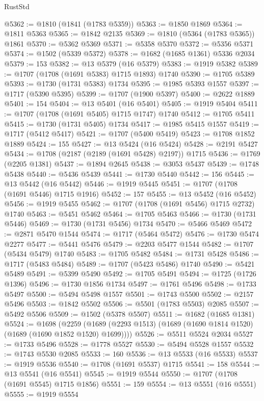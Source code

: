 \begin{lexlean}{RustStd}
\begin{coremodule}
@5362 := @1810 (@1841 (@1783 @5359))
@5363 := @1850 @1869
@5364 := @1811 @5363
@5365 := @1842 @2135
@5369 := @1810 (@5364 (@1783 @5365)) @1861
@5370 := @5362 @5369
@5371 := @5358 @5370
@5372 := @5356 @5371
@5374 := @1502 (@5339 @5372)
@5378 := @1682 (@1685 @1361) @5336 @2034
@5379 := 153
@5382 := @13 @5379 (@16 @5379)
@5383 := @1919 @5382
@5389 := @1707 (@1708 (@1691 @5383) @1715 @1893) @1740
@5390 := @1705 @5389
@5393 := @1730 (@1731 @5383) @1734
@5395 := @1985 @5393 @1557
@5397 := @1717 (@5390 @5395)
@5399 := @1707 (@1900 @5397)
@5400 := @2622 @1889
@5401 := 154
@5404 := @13 @5401 (@16 @5401)
@5405 := @1919 @5404
@5411 := @1707 (@1708 (@1691 @5405) @1715 @1747) @1740
@5412 := @1705 @5411
@5415 := @1730 (@1731 @5405) @1734
@5417 := @1985 @5415 @1557
@5419 := @1717 (@5412 @5417)
@5421 := @1707 (@5400 @5419)
@5423 := @1708 @1852 @1889
@5424 := 155
@5427 := @13 @5424 (@16 @5424)
@5428 := @2191 @5427
@5434 := @1708 (@2187 (@2189 (@1691 @5428) @2197)) @1715
@5436 := @1769 (@2205 @1381)
@5437 := @1894 @2645
@5438 := @3053 @5437
@5439 := @1748 @5438
@5440 := @5436 @5439
@5441 := @1730 @5440
@5442 := 156
@5445 := @13 @5442 (@16 @5442)
@5446 := @1919 @5445
@5451 := @1707 (@1708 (@1691 @5446) @1715 @1916)
@5452 := 157
@5455 := @13 @5452 (@16 @5452)
@5456 := @1919 @5455
@5462 := @1707 (@1708 (@1691 @5456) @1715 @2732) @1740
@5463 := @5451 @5462
@5464 := @1705 @5463
@5466 := @1730 (@1731 @5446)
@5469 := @1730 (@1731 @5456) @1734
@5470 := @5466 @5469
@5472 := @2871 @5470 @1544
@5474 := @1717 (@5464 @5472)
@5476 := @1730 @5474 @2277
@5477 := @5441 @5476
@5479 := @2203 @5477 @1544
@5482 := @1707 (@5434 @5479) @1740
@5483 := @1705 @5482
@5484 := @1731 @5428
@5486 := @1717 (@5483 @5484)
@5489 := @1707 (@5423 @5486) @1740
@5490 := @5421 @5489
@5491 := @5399 @5490
@5492 := @1705 @5491
@5494 := @1725 (@1726 @1396)
@5496 := @1730 @1856 @1734
@5497 := @1761 @5496
@5498 := @1733 @5497
@5500 := @5494 @5498 @1557
@5501 := @1743 @5500
@5502 := @2157 @5496
@5503 := @1842 @5502
@5506 := @5501 (@1783 @5503) @2085
@5507 := @5492 @5506
@5509 := @1502 (@5378 @5507)
@5511 := @1682 (@1685 @1381)
@5524 := @1698
    (@2259 (@1689 (@2293 @1513) (@1689 (@1690 @1814 @1520) (@1689 (@1690 @1852 @1520) @1699))))
@5526 := @5511 @5524 @2034
@5527 := @1733 @5496
@5528 := @1778 @5527
@5530 := @5494 @5528 @1557
@5532 := @1743 @5530 @2085
@5533 := 160
@5536 := @13 @5533 (@16 @5533)
@5537 := @1919 @5536
@5540 := @1708 (@1691 @5537) @1715
@5541 := 158
@5544 := @13 @5541 (@16 @5541)
@5545 := @1919 @5544
@5550 := @1707 (@1708 (@1691 @5545) @1715 @1856)
@5551 := 159
@5554 := @13 @5551 (@16 @5551)
@5555 := @1919 @5554

\end{coremodule}
\end{lexlean}
